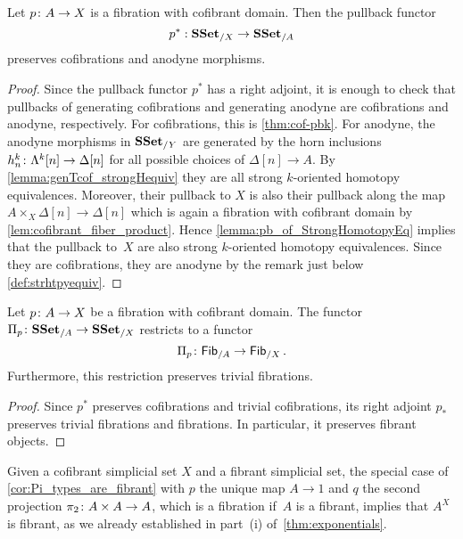 \documentclass[reqno,10pt,a4paper,oneside,draft]{amsart}
\begin{document}
\begin{proposition}\label{prop:Frobenius}
Let $p \colon A \rightarrow X$ is a fibration with cofibrant domain. Then the pullback functor 
\[
p^* : \mathbf{SSet}_{/X} \rightarrow \mathbf{SSet}_{/A}
\] 
preserves cofibrations and anodyne morphisms.
\end{proposition}


\begin{proof} Since the pullback functor $p^*$ has a right adjoint,  it is enough to check that pullbacks of generating cofibrations and generating anodyne are cofibrations and anodyne, respectively. For cofibrations, this is \cref{thm:cof-pbk}. For anodyne, the anodyne morphisms in $\mathbf{SSet}_{/Y}$ are generated by the horn inclusions $h^k_n \colon \Lambda^{k}[n] \rightarrow \Delta[n]$ for all possible choices of $\Delta[n] \rightarrow A$. By \cref{lemma:genTcof_strongHequiv} they are all strong $k$-oriented homotopy equivalences. Moreover, their pullback to $X$ is also their pullback along the map $A \times_X \Delta[n] \rightarrow \Delta[n]$ which is again a fibration with cofibrant domain by \cref{lem:cofibrant_fiber_product}. Hence  \cref{lemma:pb_of_StrongHomotopyEq} implies that the pullback 
to~$X$ are also strong $k$-oriented homotopy equivalences. Since they are cofibrations, they are anodyne by the remark just below \cref{def:strhtpyequiv}.
\end{proof}



\begin{corollary}\label{cor:Pi_types_are_fibrant}
Let $p \colon A \rightarrow X$ be a fibration with cofibrant domain. The functor $\Pi_p \colon \mathbf{SSet}_{/A} \to \mathbf{SSet}_{/X}$ restricts to a functor
\[
\Pi_p \colon \mathsf{Fib}_{/A}  \to \mathsf{Fib}_{/X} \, .
\]
Furthermore, this restriction preserves  trivial fibrations.

\end{corollary}

\begin{proof}
Since $p^*$ preserves cofibrations and trivial cofibrations, its right adjoint $p_*$ preserves trivial fibrations and fibrations. In particular, it preserves fibrant objects.
\end{proof}


Given a cofibrant simplicial set $X$ and a fibrant simplicial set, the special case of \cref{cor:Pi_types_are_fibrant} with $p$   the unique map $A \to 1$ and $q$ the second projection 
$\pi_2 \colon A \times A \to A$, which is a fibration if~$A$ is a  fibrant, implies that $A^X$ is fibrant, as we already established in part~(i) 
of~\cref{thm:exponentials}. 
\end{document}

